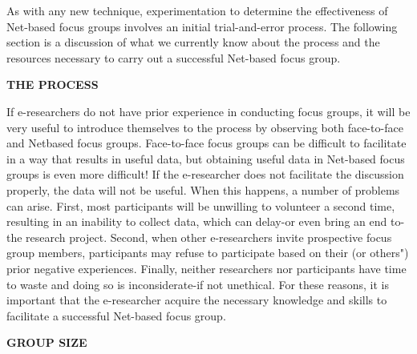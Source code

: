 \documentclass[a4]{article}
\begin{document}
As with any new technique, experimentation to determine the effectiveness of Net-based focus groups involves an initial trial-and-error process. The following section is a discussion of what we currently know about the process and the resources necessary to carry out a successful Net-based focus group.

\vspace{0.5cm}
{\large\textbf{THE PROCESS}}
\vspace{0.5cm}

If e-researchers do not have prior experience in conducting focus groups, it will be very useful to introduce themselves to the process by observing both face-to-face and Netbased focus groups. Face-to-face focus groups can be difficult to facilitate in a way that results in useful data, but obtaining useful data in Net-based focus groups is even more difficult! If the e-researcher does not facilitate the discussion properly, the data will not be useful. When this happens, a number of problems can arise. First, most participants will be unwilling to volunteer a second time, resulting in an inability to collect data, which can delay-or even bring an end to-the research project. Second, when other e-researchers invite prospective focus group members, participants may refuse to participate based on their (or others") prior negative experiences. Finally, neither researchers nor participants have time to waste and doing so is inconsiderate-if not unethical. For these reasons, it is important that the e-researcher acquire the necessary knowledge and skills to facilitate a successful Net-based focus group.

\vspace{0.5cm}
{\large\textbf{GROUP SIZE}}
\vspace{0.5cm}
\end{document}

